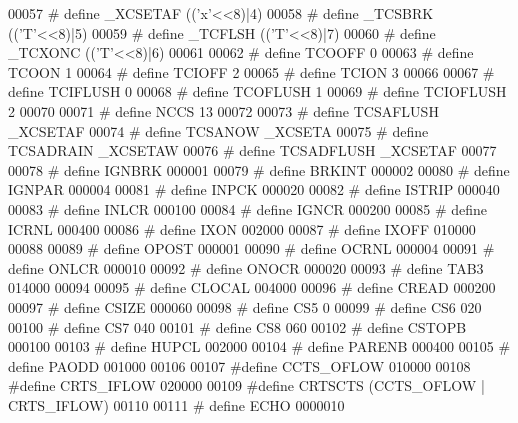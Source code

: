 \begin{DoxyCode}
00057 \textcolor{preprocessor}{# define \_XCSETAF (('x'<<8)|4)}
00058 \textcolor{preprocessor}{# define \_TCSBRK (('T'<<8)|5)}
00059 \textcolor{preprocessor}{# define \_TCFLSH (('T'<<8)|7)}
00060 \textcolor{preprocessor}{# define \_TCXONC (('T'<<8)|6)}
00061 
00062 \textcolor{preprocessor}{# define TCOOFF 0}
00063 \textcolor{preprocessor}{# define TCOON  1}
00064 \textcolor{preprocessor}{# define TCIOFF 2}
00065 \textcolor{preprocessor}{# define TCION  3}
00066 
00067 \textcolor{preprocessor}{# define TCIFLUSH 0}
00068 \textcolor{preprocessor}{# define TCOFLUSH 1}
00069 \textcolor{preprocessor}{# define TCIOFLUSH  2}
00070 
00071 \textcolor{preprocessor}{# define NCCS 13}
00072 
00073 \textcolor{preprocessor}{# define TCSAFLUSH  \_XCSETAF}
00074 \textcolor{preprocessor}{# define TCSANOW  \_XCSETA}
00075 \textcolor{preprocessor}{# define TCSADRAIN  \_XCSETAW}
00076 \textcolor{preprocessor}{# define TCSADFLUSH \_XCSETAF}
00077 
00078 \textcolor{preprocessor}{# define IGNBRK 000001}
00079 \textcolor{preprocessor}{# define BRKINT 000002}
00080 \textcolor{preprocessor}{# define IGNPAR 000004}
00081 \textcolor{preprocessor}{# define INPCK  000020}
00082 \textcolor{preprocessor}{# define ISTRIP 000040}
00083 \textcolor{preprocessor}{# define INLCR  000100}
00084 \textcolor{preprocessor}{# define IGNCR  000200}
00085 \textcolor{preprocessor}{# define ICRNL  000400}
00086 \textcolor{preprocessor}{# define IXON 002000}
00087 \textcolor{preprocessor}{# define IXOFF  010000}
00088 
00089 \textcolor{preprocessor}{# define OPOST  000001}
00090 \textcolor{preprocessor}{# define OCRNL  000004}
00091 \textcolor{preprocessor}{# define ONLCR  000010}
00092 \textcolor{preprocessor}{# define ONOCR  000020}
00093 \textcolor{preprocessor}{# define TAB3 014000}
00094 
00095 \textcolor{preprocessor}{# define CLOCAL 004000}
00096 \textcolor{preprocessor}{# define CREAD  000200}
00097 \textcolor{preprocessor}{# define CSIZE  000060}
00098 \textcolor{preprocessor}{# define CS5  0}
00099 \textcolor{preprocessor}{# define CS6  020}
00100 \textcolor{preprocessor}{# define CS7  040}
00101 \textcolor{preprocessor}{# define CS8  060}
00102 \textcolor{preprocessor}{# define CSTOPB 000100}
00103 \textcolor{preprocessor}{# define HUPCL  002000}
00104 \textcolor{preprocessor}{# define PARENB 000400}
00105 \textcolor{preprocessor}{# define PAODD  001000}
00106 
00107 \textcolor{preprocessor}{#define CCTS\_OFLOW 010000}
00108 \textcolor{preprocessor}{#define CRTS\_IFLOW 020000}
00109 \textcolor{preprocessor}{#define CRTSCTS (CCTS\_OFLOW | CRTS\_IFLOW)}
00110 
00111 \textcolor{preprocessor}{# define ECHO 0000010}

\end{DoxyCode}
